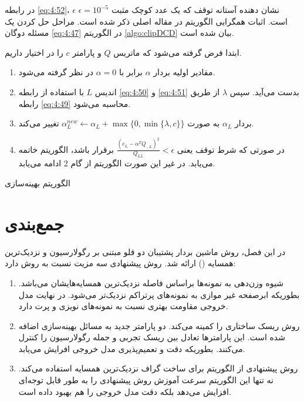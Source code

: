 در رابطه \ref{eq:4:52}،  $\epsilon$ نشان دهنده آستانه توقف که یک عدد کوچک مثبت  $\epsilon=10^{-5}$ است. اثبات همگرایی الگوریتم  در مقاله اصلی \cite{peng2014} ذکر شده است. مراحل حل کردن یک مسئله دوگان \ref{eq:4:47} در الگوریتم \ref{algo:clipDCD} بیان شده است. 

\begin{algorithm}[h]
\begin{steps}
		
ابتدا فرض گرفته می‌شود که ماتریس $Q$  و پارامتر $c$  را در اختیار داریم.

\begin{enumerate}
	\item 	مقادیر اولیه بردار $\alpha$  برابر با $\alpha=0$  در نظر گرفته می‌شود.
	\item 	اندیس $L$  با استفاده از رابطه \ref{eq:4:50} و \ref{eq:4:51} بدست می‌آید. سپس $\lambda$  از طریق رابطه \ref{eq:4:49} محاسبه می‌شود.
	\item 	بردار $\alpha_{L}$  به صورت $\alpha^{new}_{L} \leftarrow \alpha_{L} + \mathop{max}\{0, \mathop{min}\{\lambda,c\}\}$  تغییر می‌کند.
	\item 	در صورتی که شرط توقف یعنی $\frac{(e_{L} - \alpha^{T}Q_{.,L})^{2}}{Q_{LL}} < \epsilon$  برقرار باشد، الگوریتم خاتمه می‌یابد. در غیر این صورت الگوریتم از گام 2 ادامه می‌یابد.
\end{enumerate}
\end{steps}
\caption{الگوریتم بهینه‌سازی }
\label{algo:clipDCD}
\end{algorithm}

\newpage
\section{جمع‌بندی}\label{sec:4:8}
در این فصل، روش ماشین بردار پشتیبان دو قلو مبتنی بر رگولارسیون و نزدیک‌ترین همسایه () ارائه شد. روش پیشنهادی سه مزیت نسبت به روش  دارد:
\begin{enumerate}
	\item 	شیوه وزن‌دهی به نمونه‌ها براساس فاصله نزدیک‌ترین همسایه‌هایشان می‌باشد. بطوریکه ابرصفحه غیر موازی به نمونه‌های پرتراکم نزدیک‌تر می‌شود. در نهایت مدل خروجی مقاومت بهتری نسبت به نمونه‌های نویزی و پرت دارد.
	\item 	روش   ریسک ساختاری را کمینه می‌کند. دو پارامتر جدید به مسائل بهینه‌سازی اضافه شده است. این پارامترها تعادل بین ریسک تجربی و جمله رگولارسیون را کنترل می‌کنند. بطوریکه دقت و تعمیم‌پذیری مدل خروجی افرایش می‌یابد.
	\item روش پیشنهادی از الگوریتم  برای ساخت گراف نزدیک‌ترین همسایه استفاده می‌کند. نه تنها این الگوریتم سرعت آموزش روش پیشنهادی را به طور قابل توجه‌ای افزایش می‌دهد بلکه دقت مدل خروجی را هم بهبود داده است.
\end{enumerate}

